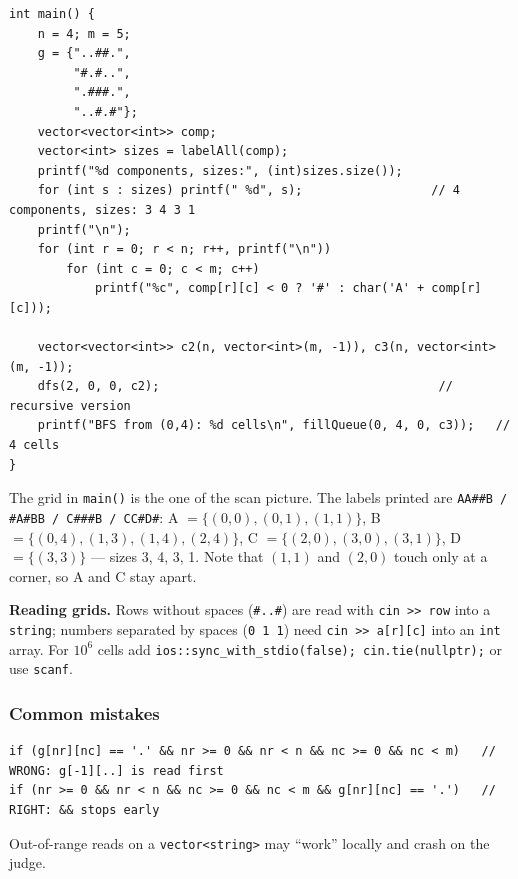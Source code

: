 \begin{lstlisting}[style=cpp]
int main() {
    n = 4; m = 5;
    g = {"..##.",
         "#.#..",
         ".###.",
         "..#.#"};
    vector<vector<int>> comp;
    vector<int> sizes = labelAll(comp);
    printf("%d components, sizes:", (int)sizes.size());
    for (int s : sizes) printf(" %d", s);                  // 4 components, sizes: 3 4 3 1
    printf("\n");
    for (int r = 0; r < n; r++, printf("\n"))
        for (int c = 0; c < m; c++)
            printf("%c", comp[r][c] < 0 ? '#' : char('A' + comp[r][c]));

    vector<vector<int>> c2(n, vector<int>(m, -1)), c3(n, vector<int>(m, -1));
    dfs(2, 0, 0, c2);                                       // recursive version
    printf("BFS from (0,4): %d cells\n", fillQueue(0, 4, 0, c3));   // 4 cells
}
\end{lstlisting}

\begin{insightbox}
The grid in \texttt{main()} is the one of the scan picture. The labels printed are
\texttt{AA\#\#B / \#A\#BB / C\#\#\#B / CC\#D\#}: A $=\{(0,0),(0,1),(1,1)\}$, B $=\{(0,4),(1,3),(1,4),(2,4)\}$, C $=\{(2,0),(3,0),(3,1)\}$, D $=\{(3,3)\}$ --- sizes 3, 4, 3, 1. Note that $(1,1)$ and $(2,0)$ touch only at a corner, so A and C stay apart.
\end{insightbox}

\textbf{Reading grids.} Rows without spaces (\texttt{\#..\#}) are read with \texttt{cin >> row} into a \texttt{string}; numbers separated by spaces (\texttt{0 1 1}) need \texttt{cin >> a[r][c]} into an \texttt{int} array. For $10^6$ cells add \texttt{ios::sync\_with\_stdio(false); cin.tie(nullptr);} or use \texttt{scanf}.

\subsubsection*{Common mistakes}

\begin{warningbox}
\begin{lstlisting}[style=snippet]
if (g[nr][nc] == '.' && nr >= 0 && nr < n && nc >= 0 && nc < m)   // WRONG: g[-1][..] is read first
if (nr >= 0 && nr < n && nc >= 0 && nc < m && g[nr][nc] == '.')   // RIGHT: && stops early
\end{lstlisting}
Out-of-range reads on a \texttt{vector<string>} may ``work'' locally and crash on the judge.
\end{warningbox}

